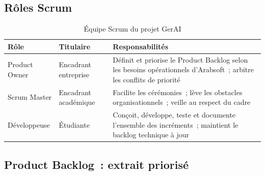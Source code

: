 \subsection{Rôles Scrum}

\begin{table}[H]
\centering
\caption{Équipe Scrum du projet GerAI}
\label{tab:scrum_team}
\begin{tabularx}{\textwidth}{|l|l|L|}
\hline
{}\textbf{Rôle} & \textbf{Titulaire} & \textbf{Responsabilités} \\\hline
{}
Product Owner & Encadrant entreprise & Définit et priorise le Product Backlog selon
  les besoins opérationnels d'Arabsoft~; arbitre les conflits de priorité \\\hline
Scrum Master & Encadrant académique & Facilite les cérémonies~; lève les obstacles
  organisationnels~; veille au respect du cadre \\\hline
{}
Développeuse & Étudiante & Conçoit, développe, teste et documente l'ensemble
  des incréments~; maintient le backlog technique à jour \\\hline
\end{tabularx}
\end{table}

\subsection{Product Backlog~: extrait priorisé}

